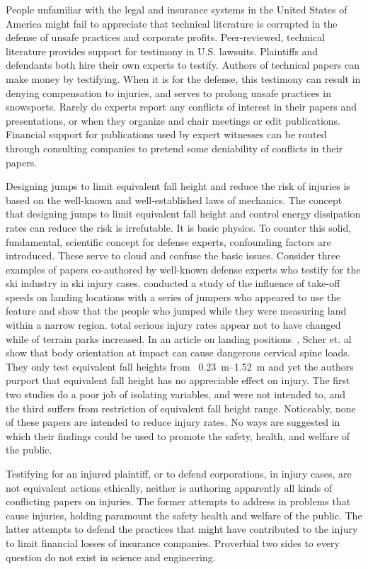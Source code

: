 \documentclass{article}
\begin{document}
People unfamiliar with the legal and insurance systems in the United States of
America might fail to appreciate that technical literature is corrupted in the
defense of unsafe practices and corporate profits. Peer-reviewed, technical
literature provides support for testimony in U.S. lawsuits. Plaintiffs and
defendants both hire their own experts to testify. Authors of technical papers
can make money by testifying. When it is for the defense, this testimony can
result in denying compensation to injuries, and serves to prolong unsafe
practices in snowsports. Rarely do experts report any conflicts of interest in
their papers and presentations, or when they organize and chair meetings or
edit publications. Financial support for publications used by expert witnesses
can be routed through consulting companies to pretend some deniability of
conflicts in their papers.

Designing jumps to limit equivalent fall height and reduce the risk of injuries
is based on the well-known and well-established laws of mechanics. The concept
that designing jumps to limit equivalent fall height and control energy
dissipation rates can reduce the risk is irrefutable. It is basic physics. To
counter this solid, fundamental, scientific concept for defense experts,
confounding factors are introduced. These serve to cloud and confuse the basic
issues. Consider three examples of papers co-authored by well-known defense
experts who testify for the ski industry in ski injury cases. \cite{Shealy2010}
conducted a study of the influence of take-off speeds on landing locations with
a series of jumpers who appeared to use the feature and show that the people
who jumped while they were measuring land within a narrow region.
\cite{Shealy2015} total serious injury rates appear not to have changed while
of terrain parks increased. In an article on landing
positions~\cite{Scher2015}, Scher et. al show that body orientation at impact
can cause dangerous cervical spine loads. They only test equivalent fall
heights from ~\SIrange{0.23}{1.52}{\meter} and yet the authors purport that
equivalent fall height has no appreciable effect on injury. The first two
studies do a poor job of isolating variables, and were not intended to, and the
third suffers from restriction of equivalent fall height range. Noticeably,
none of these papers are intended to reduce injury rates. No ways are suggested
in which their findings could be used to promote the safety, health, and
welfare of the public.

Testifying for an injured plaintiff, or to defend corporations, in injury
cases, are not equivalent actions ethically, neither is authoring apparently
all kinds of conflicting papers on injuries. The former attempts to address in
problems that cause injuries, holding paramount the safety health and welfare
of the public. The latter attempts to defend the practices that might have
contributed to the injury to limit financial losses of insurance companies.
Proverbial two sides to every question do not exist in science and engineering.
\end{document}
